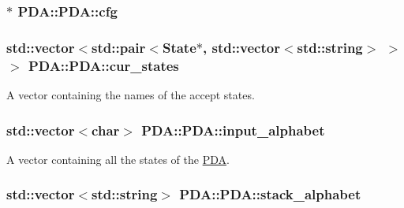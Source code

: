 \hypertarget{classPDA_1_1PDA_aef026ff20ec36b368db8cf05dc7d6ef7}{
\subsubsection[{cfg}]{$\ast$ P\-D\-A\-::\-P\-D\-A\-::cfg\hspace{0.3cm}{\ttfamily [private]}}}\label{classPDA_1_1PDA_aef026ff20ec36b368db8cf05dc7d6ef7}
\hypertarget{classPDA_1_1PDA_a0a940e3906fb9cfb1fa58fa8d329ab1b}{
\subsubsection[{cur\-\_\-states}]{\setlength{\rightskip}{0pt plus 5cm}std\-::vector$<$std\-::pair$<${\bf State}$\ast$, std\-::vector$<$std\-::string$>$ $>$ $>$ P\-D\-A\-::\-P\-D\-A\-::cur\-\_\-states\hspace{0.3cm}{\ttfamily [private]}}}\label{classPDA_1_1PDA_a0a940e3906fb9cfb1fa58fa8d329ab1b}


A vector containing the names of the accept states. 

\hypertarget{classPDA_1_1PDA_a54db260eece0bfe0d5aad0ef13f18a02}{
\subsubsection[{input\-\_\-alphabet}]{\setlength{\rightskip}{0pt plus 5cm}std\-::vector$<$char$>$ P\-D\-A\-::\-P\-D\-A\-::input\-\_\-alphabet\hspace{0.3cm}{\ttfamily [private]}}}\label{classPDA_1_1PDA_a54db260eece0bfe0d5aad0ef13f18a02}


A vector containing all the states of the \hyperlink{classPDA_1_1PDA}{P\-D\-A}. 

\hypertarget{classPDA_1_1PDA_a90a4f96e28003d5bfa4d67b4c7a191b5}{
\subsubsection[{stack\-\_\-alphabet}]{\setlength{\rightskip}{0pt plus 5cm}std\-::vector$<$std\-::string$>$ P\-D\-A\-::\-P\-D\-A\-::stack\-\_\-alphabet\hspace{0.3cm}{\ttfamily [private]}}}\label{classPDA_1_1PDA_a90a4f96e28003d5bfa4d67b4c7a191b5}


